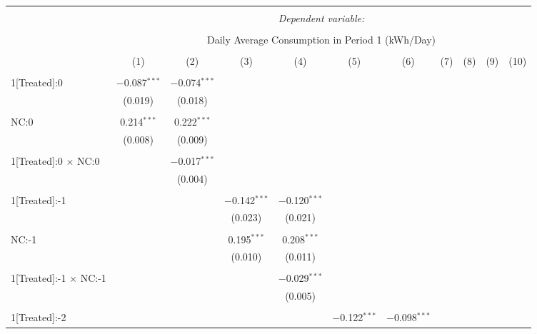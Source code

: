 
\begin{table}[!htbp] \centering 
  \caption{} 
  \label{} 
\tiny 
\begin{tabular}{@{\extracolsep{5pt}}lcccccccccc} 
\\[-1.8ex]\hline 
\hline \\[-1.8ex] 
 & \multicolumn{10}{c}{\textit{Dependent variable:}} \\ 
\cline{2-11} 
\\[-1.8ex] & \multicolumn{10}{c}{Daily Average Consumption in Period 1 (kWh/Day)} \\ 
\\[-1.8ex] & (1) & (2) & (3) & (4) & (5) & (6) & (7) & (8) & (9) & (10)\\ 
\hline \\[-1.8ex] 
 1[Treated]:0 & $-$0.087$^{***}$ & $-$0.074$^{***}$ &  &  &  &  &  &  &  &  \\ 
  & (0.019) & (0.018) &  &  &  &  &  &  &  &  \\ 
  & & & & & & & & & & \\ 
 NC:0 & 0.214$^{***}$ & 0.222$^{***}$ &  &  &  &  &  &  &  &  \\ 
  & (0.008) & (0.009) &  &  &  &  &  &  &  &  \\ 
  & & & & & & & & & & \\ 
 1[Treated]:0 $\times$ NC:0 &  & $-$0.017$^{***}$ &  &  &  &  &  &  &  &  \\ 
  &  & (0.004) &  &  &  &  &  &  &  &  \\ 
  & & & & & & & & & & \\ 
 1[Treated]:-1 &  &  & $-$0.142$^{***}$ & $-$0.120$^{***}$ &  &  &  &  &  &  \\ 
  &  &  & (0.023) & (0.021) &  &  &  &  &  &  \\ 
  & & & & & & & & & & \\ 
 NC:-1 &  &  & 0.195$^{***}$ & 0.208$^{***}$ &  &  &  &  &  &  \\ 
  &  &  & (0.010) & (0.011) &  &  &  &  &  &  \\ 
  & & & & & & & & & & \\ 
 1[Treated]:-1 $\times$ NC:-1 &  &  &  & $-$0.029$^{***}$ &  &  &  &  &  &  \\ 
  &  &  &  & (0.005) &  &  &  &  &  &  \\ 
  & & & & & & & & & & \\ 
 1[Treated]:-2 &  &  &  &  & $-$0.122$^{***}$ & $-$0.098$^{***}$ &  &  &  &  \\ 

\end{tabular}
\end{table}
